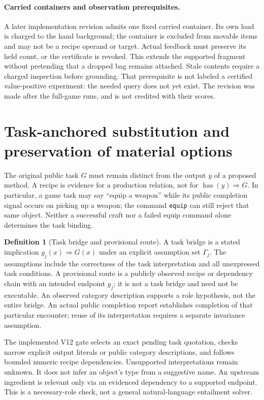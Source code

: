 \documentclass[11pt]{article}
\theoremstyle{definition}
\newtheorem{definition}[theorem]{Definition}
\begin{document}
\paragraph{Carried containers and observation prerequisites.}
A later implementation revision admits one fixed carried container. Its own
load is charged to the hand background; the container is excluded from movable
items and may not be a recipe operand or target. Actual feedback must preserve
its held count, or the certificate is revoked. This extends the supported
fragment without pretending that a dropped bag remains attached. Stale contents
require a charged inspection before grounding. That prerequisite is not labeled
a certified value-positive experiment: the needed query does not yet exist.
The revision was made after the full-game runs, and is not credited with their
scores.

\section{Task-anchored substitution and preservation of material options}
\label{sec:substitution}
The original public task $G$ must remain distinct from the output $y$ of a
proposed method. A recipe is evidence for a production relation, not for
$\operatorname{has}(y)\Rightarrow G$. In particular, a game task may say
``equip a weapon'' while its public completion signal occurs on picking up a
weapon; the command \texttt{equip} can still reject that same object. Neither a
successful craft nor a failed equip command alone determines the task binding.

\begin{definition}[Task bridge and provisional route]
A task bridge is a stated implication $g_j(x)\Rightarrow G(x)$ under an explicit
assumption set $\Gamma_j$. The assumptions include the correctness of the task
interpretation and all unexpressed task conditions. A provisional route is a
publicly observed recipe or dependency chain with an intended endpoint $g_j$;
it is not a task bridge and need not be executable. An observed category
description supports a role hypothesis, not the entire bridge. An actual public
completion report establishes completion of that particular encounter; reuse
of its interpretation requires a separate invariance assumption.
\end{definition}

The implemented V12 gate selects an exact pending task quotation, checks narrow
explicit output literals or public category descriptions, and follows bounded
numeric recipe dependencies. Unsupported interpretations remain unknown.
It does not infer an object's type from a suggestive name. An upstream ingredient
is relevant only via an evidenced dependency to a supported endpoint. This is
a necessary-role check, not a general natural-language entailment solver.
\end{document}
